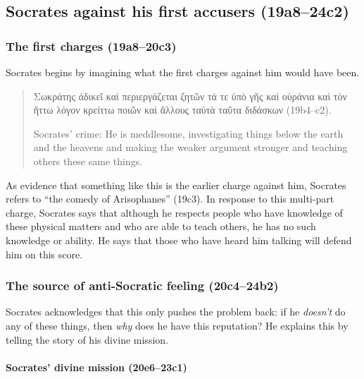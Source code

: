 \documentclass[11pt]{article}
\begin{document}
\subsection{Socrates against his first accusers (19a8--24c2)}

\subsubsection{The first charges (19a8--20c3)}

Socrates begins by imagining what the first charges against him would have been.

\begin{quote}
    {\g
    Σωκράτης ἀδικεῖ καὶ περιεργάζεται ζητῶν τά τε ὑπὸ γῆς καὶ οὐράνια καὶ τὸν ἥττω λόγον κρείττω ποιῶν καὶ ἄλλους ταὐτὰ ταῦτα διδάσκων
    } (19b4--c2).

    Socrates' crime: He is meddlesome, investigating things below the earth and the heavens and making the weaker argument stronger and teaching others these same things.
\end{quote}

As evidence that something like this is the earlier charge against him, Socrates refers to ``the comedy of Arisophanes'' (19c3).  In response to this multi-part charge, Socrates says that although he respects people who have knowledge of these physical matters and who are able to teach others, he has no such knowledge or ability.  He says that those who have heard him talking will defend him on this score.


\subsubsection{The source of anti-Socratic feeling (20c4--24b2)}

Socrates acknowledges that this only pushes the problem back: if he \emph{doesn't} do any of these things, then \emph{why} does he have this reputation?  He explains this by telling the story of his divine mission.

\paragraph{Socrates' divine mission (20e6--23c1)}
\end{document}
